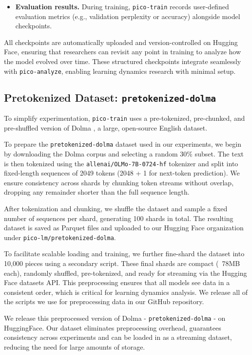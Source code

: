 {\begin{itemize}
    \item \textbf{Evaluation results.} During training, \texttt{pico-train} records user-defined evaluation metrics (e.g., validation perplexity or accuracy) alongside model checkpoints.
\end{itemize}
\vspace{-0.2em}
All checkpoints are automatically uploaded and version-controlled on Hugging Face, ensuring that researchers can revisit any point in training to analyze how the model evolved over time. These structured checkpoints integrate seamlessly with \texttt{pico-analyze}, enabling learning dynamics research with minimal setup.

\subsection{Pretokenized Dataset: \texttt{pretokenized-dolma}}

To simplify experimentation, \texttt{pico-train} uses a pre-tokenized, pre-chunked, and pre-shuffled version of Dolma \citep{soldaini2024dolma}, a large, open-source English dataset. 

To prepare the \texttt{pretokenized-dolma} dataset used in our experiments, we begin by downloading the Dolma corpus and selecting a random 30\% subset. The text is then tokenized using the \verb|allenai/OLMo-7B-0724-hf| tokenizer and split into fixed-length sequences of 2049 tokens (2048 + 1 for next-token prediction). We ensure consistency across shards by chunking token streams without overlap, dropping any remainder shorter than the full sequence length.

After tokenization and chunking, we shuffle the dataset and sample a fixed number of sequences per shard, generating 100 shards in total. The resulting dataset is saved as Parquet files and uploaded to our Hugging Face organization under \verb|pico-lm/pretokenized-dolma|.

To facilitate scalable loading and training, we further fine-shard the dataset into 10,000 pieces using a secondary script. These final shards are compact (~78MB each), randomly shuffled, pre-tokenized, and ready for streaming via the Hugging Face datasets API. This preprocessing ensures that all models see data in a consistent order, which is critical for learning dynamics analysis. We release all of the scripts we use for preprocessing data in our GitHub repository.

We release this preprocessed version of Dolma - \texttt{pretokenized-dolma} - on HuggingFace. Our dataset eliminates preprocessing overhead, guarantees consistency across experiments and can be loaded in as a streaming dataset, reducing the need for large amounts of storage.

}
